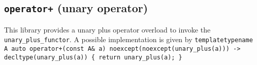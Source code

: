 \subsection{\texttt{operator+} (unary operator)}
This library provides a unary plus operator overload to invoke the \texttt{unary\_plus\_functor}.
A possible implementation is given by\newline
\texttt{template\textlangle typename A\textrangle\newline
auto\newline
operator+(const A\& a)\newline
noexcept(noexcept(unary\_plus(a)))\newline
-> decltype(unary\_plus(a))\newline
\{ return unary\_plus(a); \}}
